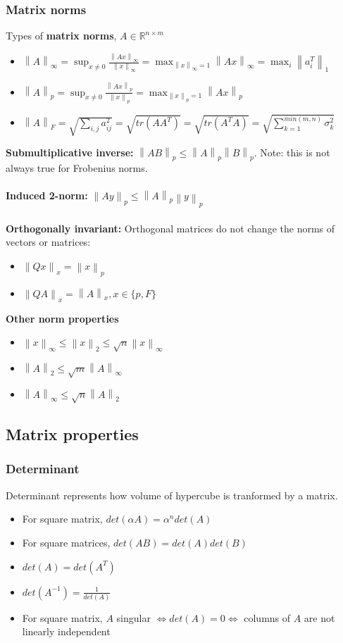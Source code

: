 \documentclass{article}
\newcommand{\norm}[2]{\left\lVert#1\right\rVert_#2}
\begin{document}
\subsubsection{Matrix norms}
\noindent Types of \textbf{matrix norms}, $A \in \mathbb{R}^{n \times m}$
\begin{itemize}
    \item $\norm{A}{\infty} = \sup_{x\neq 0}\frac{\norm{Ax}{\infty}}{\norm{x}{\infty}} = \max_{\norm{x}{\infty}=1}\norm{Ax}{\infty} = \max_i\norm{a_i^T}{1}$
    \item $\norm{A}{p} = \sup_{x\neq 0}\frac{\norm{Ax}{p}}{\norm{x}{p}} = \max_{\norm{x}{p}=1}\norm{Ax}{p}$
    \item $\norm{A}{F} = \sqrt{\sum_{i,j} a_{ij}^2} = \sqrt{tr(AA^T)} = \sqrt{tr(A^TA)} = \sqrt{\sum_{k=1}^{min(m,n)}\sigma_k^2} $
\end{itemize}
\textbf{Submultiplicative inverse:} $\norm{AB}{p} \leq \norm{A}{p}\norm{B}{p}$. Note: this is not always true for Frobenius norms.\\ \\
\textbf{Induced 2-norm: } $\norm{Ay}{p} \leq \norm{A}{p}\norm{y}{p}$\\ \\
\textbf{Orthogonally invariant:} Orthogonal matrices do not change the norms of vectors or matrices:
\begin{itemize}
    \item $\norm{Qx}{x} = \norm{x}{p}$
    \item $\norm{QA}{x} = \norm{A}{x}, x \in \{p, F\}$
\end{itemize}

\textbf{Other norm properties}
\begin{itemize}
    \item $\norm{x}{\infty} \leq \norm{x}{2} \leq \sqrt{n}\norm{x}{\infty}$
    \item $\norm{A}{2} \leq \sqrt{m}\norm{A}{\infty}$
    \item $\norm{A}{\infty} \leq \sqrt{n}\norm{A}{2}$
\end{itemize}

\subsection{Matrix properties}
\subsubsection{Determinant}
Determinant represents how volume of hypercube is tranformed by a matrix.
\begin{itemize}
    \item For square matrix, $det(\alpha A) = \alpha^ndet(A)$
    \item For square matrices, $det(AB) = det(A)det(B)$
    \item $det(A) = det(A^T)$
    \item $det(A^{-1}) = \frac{1}{det(A)}$
    \item For square matrix, $A$ singular $\Leftrightarrow det(A) = 0 \Leftrightarrow$ columns of $A$ are not linearly independent
\end{itemize}
\end{document}
